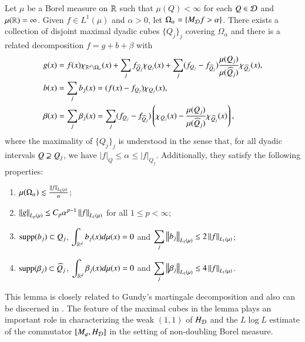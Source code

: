 \documentclass[leqno]{amsart}
\begin{document}
\begin{lemma}\label{CZ decomposition}
Let $\mu$ be a Borel measure on ${\mathbb R}$ such that $\mu(Q)<\infty$ for each $Q\in{\mathcal D}$ and $\mu({\mathbb R})=\infty$.
Given $f\in L^{1}(\mu)$ and $\alpha>0$, let $\Omega_{\alpha}=\left\{ M_{{\mathcal D}}f>\alpha \right\}$. There exists a collection of disjoint maximal dyadic cubes $\{Q_{j}\}_{j}$ covering $\Omega_{\alpha}$ and there is a related decomposition $f=g+b+\beta$ with 
\begin{align*}
&g(x)=f(x)\chi_{{\mathbb R}^{d}\setminus\Omega_{\alpha}}(x)+\sum_{j}f_{\widehat{Q}_{j}}\chi_{Q_{j}}(x)
+\sum_{j}(f_{Q_{j}}-f_{\widehat{Q}_{j}})\frac{\mu(Q_{j})}{\mu(\widehat{Q}_{j})}\chi_{\widehat{Q}_{j}}(x),\\
&b(x)=\sum_{j}b_{j}(x)=(f(x)-f_{Q_{j}})\chi_{Q_{j}}(x),\\
&\beta(x)=\sum_{j}\beta_{j}(x)=\sum_{j}(f_{Q_{j}}-f_{\widehat{Q}_{j}})
\left(\chi_{Q_{j}}(x)-\frac{\mu(Q_{j})}{\mu(\widehat{Q}_{j})}\chi_{\widehat{Q}_{j}}(x)\right),
\end{align*}
where the maximality of $\{Q_{j}\}_{j}$ is understood in the sense that, for all dyadic intervals $Q\varsupsetneq Q_{j}$, we have $|f|_{Q}\leq\alpha\leq|f|_{Q_{j}}$. 
Additionally, they satisfy the following properties:
\begin{enumerate}[\rm(i)]
\item\label{Omega upper bd} $\mu(\Omega_{\alpha})\lesssim\frac{\left\| f \right\|_{L_{1}(\mu)}}{\alpha}$;
\item\label{g upper bd} $\left\| g \right\|_{L_{p}(\mu)}\leq C_{p}\alpha^{p-1}\left\| f \right\|_{L_{1}(\mu)}$ for all $1\leq p<\infty$;
\item\label{b cancellation} ${\rm supp}(b_{j})\subset Q_{j}$, $\displaystyle\int_{{\mathbb R}^d}b_{j}(x)d\mu(x)=0$ and $\displaystyle\sum_{j}\left\| b_{j} \right\|_{L_{1}(\mu)}\leq2\left\| f \right\|_{L_{1}(\mu)}$;
\item\label{beta cancellation} ${\rm supp}(\beta_{j})\subset \widehat{Q}_{j}$, $\displaystyle\int_{{\mathbb R}^d}\beta_{j}(x)d\mu(x)=0$ and $\displaystyle\sum_{j}\left\| \beta_{j} \right\|_{L_{1}(\mu)}\leq4\left\| f \right\|_{L_{1}(\mu)}$.
\end{enumerate}
\end{lemma}

This lemma is closely related to Gundy's martingale decomposition \cite{Gu1968} and also can be discerned in \cite{CMP-book}. The feature of the maximal cubes in the lemma  plays an important role in characterizing the weak $(1,1)$ of $H_{{\mathcal D}}$ and the $L\log L$ estimate of the commutator $[M_{\varphi},H_{{\mathcal D}}]$ in the setting of non-doubling Borel measure.
\end{document}
